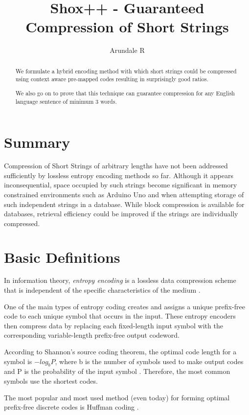 \documentclass[]{article}
\title{Shox++ - Guaranteed Compression of Short Strings}
\author{Arundale R}
\begin{document}
\maketitle

\begin{abstract}
We formulate a hybrid encoding method with which short strings could be compressed using context aware pre-mapped codes resulting in surprisingly good ratios.

We also go on to prove that this technique can guarantee compression for any English language sentence of minimum 3 words.
\end{abstract}

\section{Summary}

Compression of Short Strings of arbitrary lengths have not been addressed sufficiently by lossless entropy encoding methods so far.  Although it appears inconsequential, space occupied by such strings become significant in memory constrained environments such as Arduino Uno and when attempting storage of such independent strings in a database. While block compression is available for databases, retrieval efficiency could be improved if the strings are individually compressed.

\section{Basic Definitions}

In information theory, \emph{entropy encoding} is a lossless data compression scheme that is independent of the specific characteristics of the medium \cite{1}.

One of the main types of entropy coding creates and assigns a unique prefix-free code to each unique symbol that occurs in the input. These entropy encoders then compress data by replacing each fixed-length input symbol with the corresponding variable-length prefix-free output codeword.

According to Shannon's source coding theorem, the optimal code length for a symbol is $-log_bP$, where b is the number of symbols used to make output codes and P is the probability of the input symbol \cite{2}. Therefore, the most common symbols use the shortest codes.

The most popular and most used method (even today) for forming optimal prefix-free discrete codes is Huffman coding \cite{3}.
\end{document}
